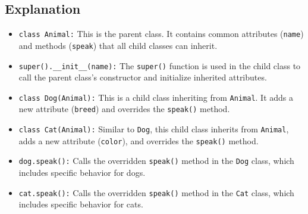 \subsection{Explanation}
\begin{itemize}
	\item \texttt{class Animal:} This is the parent class. It contains common attributes (\texttt{name}) and methods (\texttt{speak}) that all child classes can inherit.
	\item \texttt{super().\_\_init\_\_(name):} The \texttt{super()} function is used in the child class to call the parent class's constructor and initialize inherited attributes.
	\item \texttt{class Dog(Animal):} This is a child class inheriting from \texttt{Animal}. It adds a new attribute (\texttt{breed}) and overrides the \texttt{speak()} method.
	\item \texttt{class Cat(Animal):} Similar to \texttt{Dog}, this child class inherits from \texttt{Animal}, adds a new attribute (\texttt{color}), and overrides the \texttt{speak()} method.
	\item \texttt{dog.speak():} Calls the overridden \texttt{speak()} method in the \texttt{Dog} class, which includes specific behavior for dogs.
	\item \texttt{cat.speak():} Calls the overridden \texttt{speak()} method in the \texttt{Cat} class, which includes specific behavior for cats.
\end{itemize}







